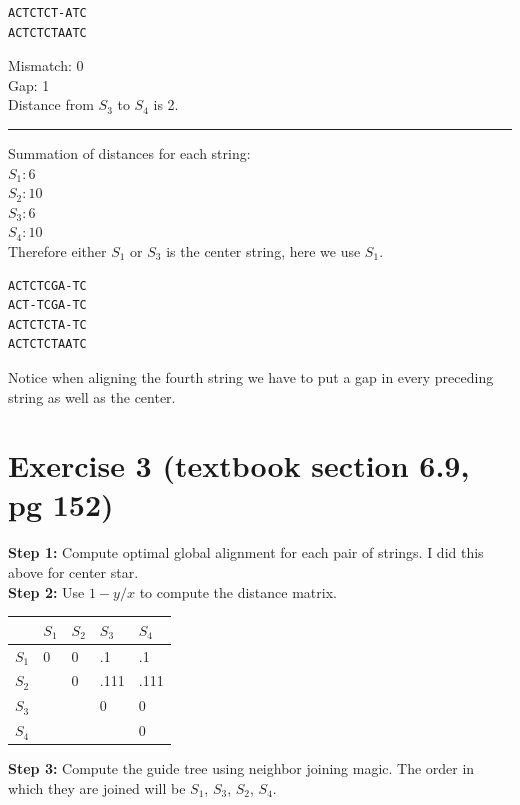 \documentclass{article}
\begin{document}
\begin{verbatim} 
ACTCTCT-ATC 
ACTCTCTAATC
\end{verbatim}
Mismatch: 0\\
Gap: 1\\
Distance from $S_3$ to $S_4$ is 2.

\noindent\rule{8cm}{0.4pt}

Summation of distances for each string:\\
$S_1:6$\\
$S_2:10$\\
$S_3:6$\\
$S_4:10$\\

Therefore either $S_1$ or $S_3$ is the center string, here we use $S_1$.
\begin{verbatim} 
ACTCTCGA-TC
ACT-TCGA-TC
ACTCTCTA-TC
ACTCTCTAATC
\end{verbatim}

Notice when aligning the fourth string we have to put a gap in every preceding string as well as the center.

\section{Exercise 3 (textbook section 6.9, pg 152)}
\textbf{Step 1:} Compute optimal global alignment for each pair of strings.
I did this above for center star.\\
\textbf{Step 2:} Use $1-y/x$ to compute the distance matrix. 

\vspace{.5cm}

\bgroup
\def\arraystretch{1.5}%
\begin{tabularx}{8cm}{| X | X | X | X | X |}
  \hline
  \textbf{~} & \textbf{$S_1$} & \textbf{$S_2$} & \textbf{$S_3$} & \textbf{$S_4$}\\
  \hline	
  \textbf{$S_1$} & 0 & 0 & .1 & .1		\\
  \textbf{$S_2$} & ~ & 0 & .111 & .111	\\
  \textbf{$S_3$} & ~ & ~ & 0 & 0		\\
  \textbf{$S_4$} & ~ & ~ & ~ & 0		\\ 
  \hline
\end{tabularx}
\egroup

\vspace{.5cm}

\textbf{Step 3:} Compute the guide tree using neighbor joining magic. The order in which they are joined will be $S_1$, $S_3$, $S_2$, $S_4$.
\end{document}
